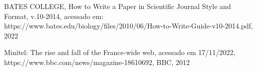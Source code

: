 \documentclass[
12pt,		%
openright,	%
twoside,  %
a4paper,			%
chapter=TITLE,		%
english,			%
french,				%
spanish,			%
brazil				%
]{USPSC-classe/USPSC}
\begin{document}
\begin{flushleft}
\begin{flushleft}
\begin{flushleft}
\begin{flushleft}
\begin{flushleft}
\begin{flushleft}
\begin{flushleft}
\begin{flushleft}
\begin{flushleft}
[BATES, 2014] BATES COLLEGE, How to Write a Paper in Scientific Journal Style and Format, v.10-2014, acessado em: https://www.bates.edu/biology/files/2010/06/How-to-Write-Guide-v10-2014.pdf, 2022
\end{flushleft}


\end{flushleft}


\end{flushleft}


\end{flushleft}


\end{flushleft}


\end{flushleft}


\end{flushleft}


\end{flushleft}


\end{flushleft}


\begin{flushleft}
\begin{flushleft}
\begin{flushleft}
\begin{flushleft}
\begin{flushleft}
\begin{flushleft}
\begin{flushleft}
\begin{flushleft}
\begin{flushleft}
[BBC, 2012] Minitel: The rise and fall of the France-wide web, acessado em 17/11/2022, https://www.bbc.com/news/magazine-18610692, BBC, 2012
\end{flushleft}


\end{flushleft}


\end{flushleft}


\end{flushleft}


\end{flushleft}


\end{flushleft}


\end{flushleft}


\end{flushleft}


\end{flushleft}
\end{document}
